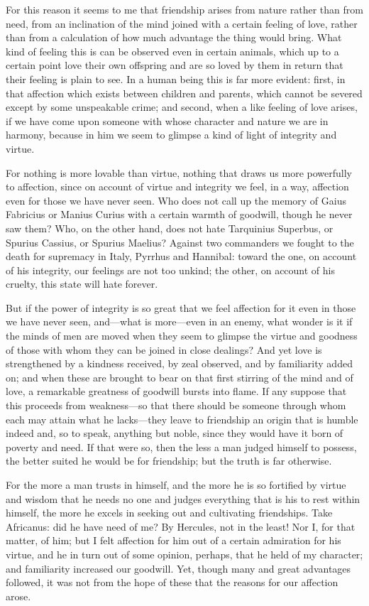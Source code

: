  For this reason it seems to me that friendship arises from nature rather than from need, from an inclination of the mind joined with a certain feeling of love, rather than from a calculation of how much advantage the thing would bring. What kind of feeling this is can be observed even in certain animals, which up to a certain point love their own offspring and are so loved by them in return that their feeling is plain to see. In a human being this is far more evident: first, in that affection which exists between children and parents, which cannot be severed except by some unspeakable crime; and second, when a like feeling of love arises, if we have come upon someone with whose character and nature we are in harmony, because in him we seem to glimpse a kind of light of integrity and virtue.

 For nothing is more lovable than virtue, nothing that draws us more powerfully to affection, since on account of virtue and integrity we feel, in a way, affection even for those we have never seen. Who does not call up the memory of Gaius Fabricius or Manius Curius with a certain warmth of goodwill, though he never saw them? Who, on the other hand, does not hate Tarquinius Superbus, or Spurius Cassius, or Spurius Maelius? Against two commanders we fought to the death for supremacy in Italy, Pyrrhus and Hannibal: toward the one, on account of his integrity, our feelings are not too unkind; the other, on account of his cruelty, this state will hate forever.

 But if the power of integrity is so great that we feel affection for it even in those we have never seen, and—what is more—even in an enemy, what wonder is it if the minds of men are moved when they seem to glimpse the virtue and goodness of those with whom they can be joined in close dealings? And yet love is strengthened by a kindness received, by zeal observed, and by familiarity added on; and when these are brought to bear on that first stirring of the mind and of love, a remarkable greatness of goodwill bursts into flame. If any suppose that this proceeds from weakness—so that there should be someone through whom each may attain what he lacks—they leave to friendship an origin that is humble indeed and, so to speak, anything but noble, since they would have it born of poverty and need. If that were so, then the less a man judged himself to possess, the better suited he would be for friendship; but the truth is far otherwise.

 For the more a man trusts in himself, and the more he is so fortified by virtue and wisdom that he needs no one and judges everything that is his to rest within himself, the more he excels in seeking out and cultivating friendships. Take Africanus: did he have need of me? By Hercules, not in the least! Nor I, for that matter, of him; but I felt affection for him out of a certain admiration for his virtue, and he in turn out of some opinion, perhaps, that he held of my character; and familiarity increased our goodwill. Yet, though many and great advantages followed, it was not from the hope of these that the reasons for our affection arose.

